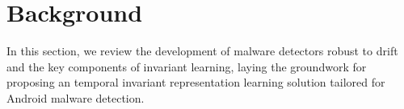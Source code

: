 \section{Background}
In this section, we review the development of malware detectors robust to drift and the key components of invariant learning, laying the groundwork for proposing an temporal invariant representation learning solution tailored for Android malware detection.




